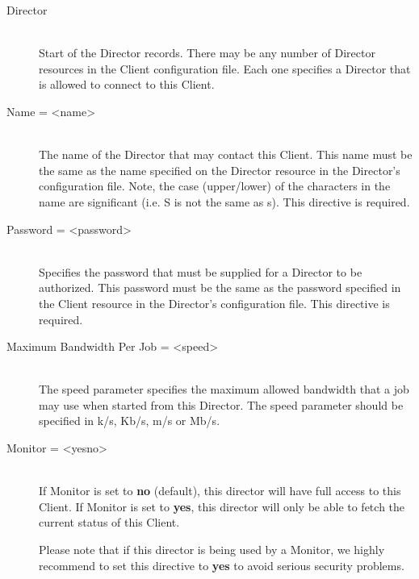 \begin{description}

\item [Director] \hfill \\
Start of the Director records. There may be any  number of Director resources
in the Client configuration file. Each  one specifies a Director that is
allowed to connect to this  Client.

\item [Name = {\textless}name{\textgreater}] \hfill \\
The name of the Director  that may contact this Client. This name must be the
same as the name specified on the Director resource  in the Director's
configuration file. Note, the case (upper/lower) of the characters in
the name are significant (i.e. S is not the same as s). This directive
is required.

\item [Password = {\textless}password{\textgreater}] \hfill \\
Specifies the password that must be  supplied for a Director to be authorized.
This password  must be the same as the password specified in the  Client
resource in the Director's configuration file.  This directive is required.

\item [Maximum Bandwidth Per Job = {\textless}speed{\textgreater}] \hfill \\
The speed parameter specifies the maximum allowed bandwidth that a job may use
when started from this Director. The speed parameter should be specified in
k/s, Kb/s, m/s or Mb/s.

\item [Monitor = {\textless}yes{\textbar}no{\textgreater}] \hfill \\
If Monitor is set to {\bf no} (default),  this director will have full access
to this Client. If Monitor is set to  {\bf yes}, this director will only be
able to fetch the current status  of this Client.

Please note that if this director is being used by a Monitor, we highly
recommend to set this directive to {\bf yes} to avoid serious security
problems.
\end{description}

